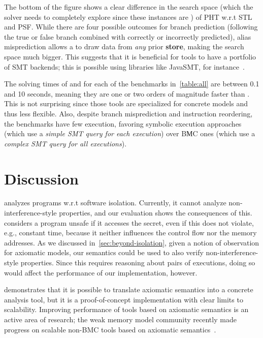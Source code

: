 \documentclass[conference]{IEEEtran}
\begin{document}
The bottom of the figure shows a clear difference in the search space (which the solver needs to completely explore since these instances are \unsat) of PHT w.r.t STL and PSF.
While there are four possible outcomes for branch prediction (following the true or false branch combined with correctly or incorrectly predicted), alias misprediction allows a \load to draw data from \emph{any} prior {\bf store}, making the search space much bigger.
This suggests that it is beneficial for tools to have a portfolio of SMT backends; this is possible using libraries like JavaSMT, for instance~\cite{BaierBF20,KarpenkovF016}.



The solving times of \spectector and \binsec for each of the benchmarks in~\autoref{table:all} are between 0.1 and 10 seconds, meaning they are one or two orders of magnitude faster than \zombmc.
This is not surprising since those tools are specialized for concrete models and thus less flexible. 
Also, despite branch misprediction and instruction reordering, the benchmarks have few execution, favoring symbolic execution approaches (which use a \emph{simple SMT query for each execution}) over {\selectfont B{М}C} ones (which use a \emph{complex SMT query for all executions}).

\section{Discussion}
\label{sec:discussion}

\zombmc analyzes programs w.r.t software isolation.
Currently, it cannot analyze non-interference-style properties, and
our evaluation shows the consequences of this.
\zombmc considers a program unsafe if it accesses the secret, even if this does not violate, e.g., constant time, because it neither influences the control flow nor the memory addresses. 
As we discussed in~\autoref{sec:beyond-isolation}, given a notion of observation for axiomatic models, our semantics could be used to also verify non-interference-style properties.
Since this requires reasoning about pairs of executions, doing so would affect the performance of our implementation, however.

\zombmc demonstrates that it is possible to translate axiomatic semantics into a concrete analysis tool, but it is a proof-of-concept implementation with clear limits to scalability.
Improving performance of tools based on axiomatic semantics is an active area of research; the weak memory model community recently made progress on scalable non-BMC tools based on axiomatic semantics~\cite{Kokologiannakis21}.
\end{document}
